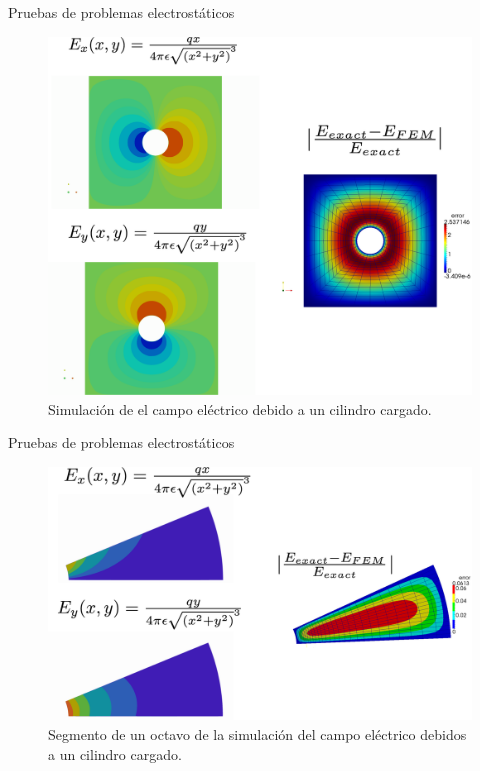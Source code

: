 \documentclass[xcolor=table,serif,handout]{beamer}
\begin{document}
	\begin{frame}{Pruebas de problemas electrostáticos}
		\begin{figure}
		\centering
		\includegraphics[scale=0.15]{charged_cylinder_inside_rectangle.eps}
		\caption{Simulación de el campo eléctrico debido a un cilindro cargado.}
		\end{figure}
	\end{frame}
	\begin{frame}{Pruebas de problemas electrostáticos}
		\begin{figure}
		\centering
		\includegraphics[scale=0.15]{Eight_of_cylinder.eps}
		\caption{Segmento de un octavo de la simulación del campo eléctrico debidos a un cilindro cargado.}
		\end{figure}
	\end{frame}
\end{document}
